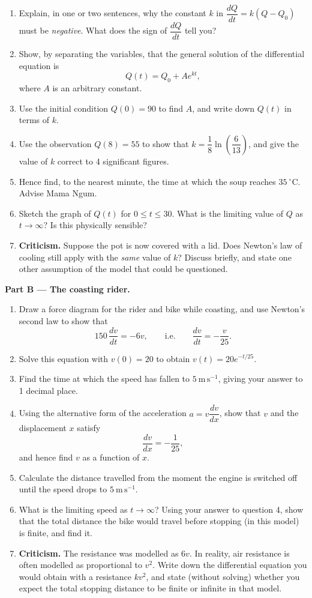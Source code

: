 \documentclass[11pt]{article}
\begin{document}
\begin{enumerate}
\item Explain, in one or two sentences, why the constant $k$ in $\dfrac{dQ}{dt}=k(Q-Q_0)$ must be \emph{negative}. What does the sign of $\dfrac{dQ}{dt}$ tell you?
\item Show, by separating the variables, that the general solution of the differential equation is
\[
Q(t)=Q_0+Ae^{kt},
\]
where $A$ is an arbitrary constant.
\item Use the initial condition $Q(0)=90$ to find $A$, and write down $Q(t)$ in terms of $k$.
\item Use the observation $Q(8)=55$ to show that $k=\dfrac{1}{8}\ln\!\left(\dfrac{6}{13}\right)$, and give the value of $k$ correct to 4 significant figures.
\item Hence find, to the nearest minute, the time at which the soup reaches $35\ ^\circ\mathrm{C}$. Advise Mama Ngum.
\item Sketch the graph of $Q(t)$ for $0\le t\le 30$. What is the limiting value of $Q$ as $t\to\infty$? Is this physically sensible?
\item \textbf{Criticism.} Suppose the pot is now covered with a lid. Does Newton's law of cooling still apply with the \emph{same} value of $k$? Discuss briefly, and state one other assumption of the model that could be questioned.
\end{enumerate}

\textbf{Part B — The coasting rider.}

\begin{enumerate}
\item Draw a force diagram for the rider and bike while coasting, and use Newton's second law to show that
\[
150\,\frac{dv}{dt}=-6v,\qquad\text{i.e.}\qquad \frac{dv}{dt}=-\frac{v}{25}.
\]
\item Solve this equation with $v(0)=20$ to obtain $v(t)=20e^{-t/25}$.
\item Find the time at which the speed has fallen to $5\ \mathrm{m\,s^{-1}}$, giving your answer to 1 decimal place.
\item Using the alternative form of the acceleration $a=v\dfrac{dv}{dx}$, show that $v$ and the displacement $x$ satisfy
\[
\frac{dv}{dx}=-\frac{1}{25},
\]
and hence find $v$ as a function of $x$.
\item Calculate the distance travelled from the moment the engine is switched off until the speed drops to $5\ \mathrm{m\,s^{-1}}$.
\item What is the limiting speed as $t\to\infty$? Using your answer to question 4, show that the total distance the bike would travel before stopping (in this model) is finite, and find it.
\item \textbf{Criticism.} The resistance was modelled as $6v$. In reality, air resistance is often modelled as proportional to $v^2$. Write down the differential equation you would obtain with a resistance $kv^2$, and state (without solving) whether you expect the total stopping distance to be finite or infinite in that model.
\end{enumerate}
\end{document}
